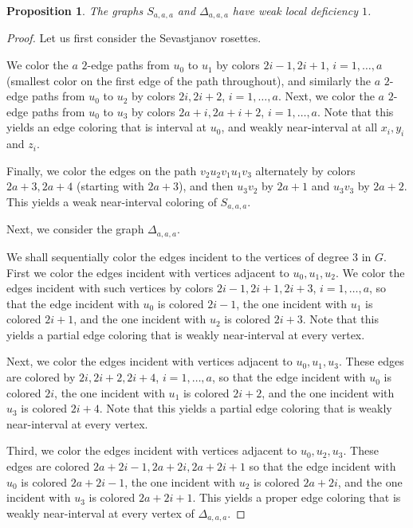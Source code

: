 \documentclass[12pt]{article}
\theoremstyle{plain}
\newtheorem{proposition}[theorem]{Proposition}
\theoremstyle{definition}
\numberwithin{equation}{section}
\begin{document}
\begin{proposition}
\label{prop:rosettes2}
	The graphs $S_{a,a,a}$ and $\Delta_{a,a,a}$ have weak local deficiency $1$.
\end{proposition}
\begin{proof}
	Let us first consider the Sevastjanov rosettes. %

	We color the $a$ $2$-edge paths from $u_0$ to $u_1$ by colors $2i-1, 2i+1$, $i=1,\dots, a$ 
	(smallest color on the first edge of the path throughout),
	and similarly the $a$ $2$-edge paths from $u_0$ to $u_2$ by colors $2i, 2i+2$, $i=1,\dots,a$.
	Next, we color the $a$ $2$-edge paths from $u_0$ to $u_3$ by colors $2a+i, 2a+i+2$, $i=1,\dots,a$.
	Note that this yields an edge coloring that is interval at $u_0$, and weakly near-interval at all 
	$x_i, y_i$ and $z_i$.

	Finally, we color the edges on the path $v_{2} u_2 v_{1} u_1 v_{3}$ alternately by colors $2a+3, 2a+4$ 
	(starting with $2a+3$),
	and then $u_3 v_{2}$ by $2a+1$ and $u_3 v_{3}$ by $2a+2$. This yields a weak near-interval coloring of $S_{a,a,a}$.

\bigskip

	Next, we consider the graph $\Delta_{a,a,a}$.

	We shall sequentially color the edges incident to the vertices of degree $3$ in $G$. First
	we color the edges incident with vertices adjacent to $u_0, u_1, u_2$. 
	We color the edges incident with such vertices
	by colors $2i-1, 2i+1, 2i+3$, $i=1,\dots, a$, so that the edge incident with $u_0$ is colored $2i-1$, 
	the one incident 
	with $u_1$
	is colored $2i+1$, and the one incident with $u_2$ is colored $2i+3$. 
	Note that this yields a partial edge coloring that is
	weakly near-interval at every vertex.

	Next, we color the edges incident with vertices adjacent to $u_0, u_1, u_3$. 
	These edges are colored by $2i, 2i+2, 2i+4$, $i=1,\dots, a$,
	so that the edge incident with $u_0$ is colored $2i$, the one incident with 
	$u_1$ is colored $2i+2$, and the one incident with
	$u_3$ is colored $2i+4$. Note that this yields a partial edge coloring that is 
	weakly near-interval at every vertex.

	Third, we color the edges incident with vertices adjacent to 
	$u_0, u_2, u_3$. These edges are colored $2a+2i-1, 2a+2i, 2a+2i+1$
	so that the edge incident with $u_0$ is colored $2a+2i-1$, 
	the one incident with $u_2$ is colored $2a+2i$, and the one
	incident with $u_3$ is colored $2a+2i+1$. This yields a proper edge coloring that is 
	weakly near-interval at every vertex of 
	$\Delta_{a,a,a}$.
\end{proof}
\end{document}
